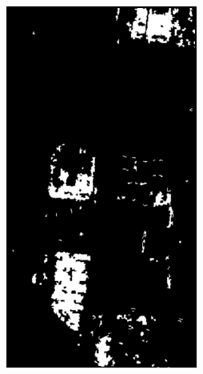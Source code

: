 \begin{figure}[t]
\begin{subfigure}[b]{0.18\columnwidth}
		\includegraphics[width=\textwidth]{Figures/CD/ADD/c}
		\caption{}
\end{subfigure}
\hspace{0.01pt}
\begin{subfigure}[b]{0.18\columnwidth}

\end{subfigure}
\end{figure}
